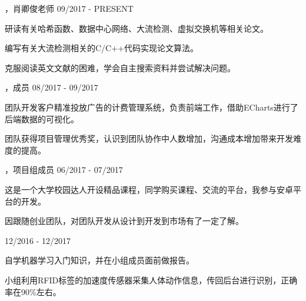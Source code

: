 \vspace{-4.0mm}

\begin{cventries}

\cvexperience
{，肖卿俊老师}
{09/2017 - PRESENT}
{
    \begin{cvitems}
    \item {研读有关哈希函数、数据中心网络、大流检测、虚拟交换机等相关论文。}
    \item {编写有关大流检测相关的C/C++代码实现论文算法。}
    \item {克服阅读英文文献的困难，学会自主搜索资料并尝试解决问题。}
    \end{cvitems}
}

\cvexperience
{，成员}
{08/2017 - 09/2017}
{
    \begin{cvitems}
    \item {团队开发客户精准投放广告的计费管理系统，负责前端工作，借助ECharts进行了后端数据的可视化。}
    \item {团队获得项目管理优秀奖，认识到团队协作中人数增加，沟通成本增加带来开发难度的提高。}
    \end{cvitems}
}

\cvexperience
{，项目组成员}
{06/2017 - 07/2017}
{
    \begin{cvitems}
    \item {这是一个大学校园达人开设精品课程，同学购买课程、交流的平台，我参与安卓平台的开发。}
    \item {因跟随创业团队，对团队开发从设计到开发到市场有了一定了解。}
    \end{cvitems}
}

 \cvexperience
 {}
 {12/2016 - 12/2017}
 {
     \begin{cvitems}
     \item {自学机器学习入门知识，并在小组成员面前做报告。}
     \item {小组利用RFID标签的加速度传感器采集人体动作信息，传回后台进行识别，正确率在90\%左右。}
     \end{cvitems}
 }
\end{cventries}
